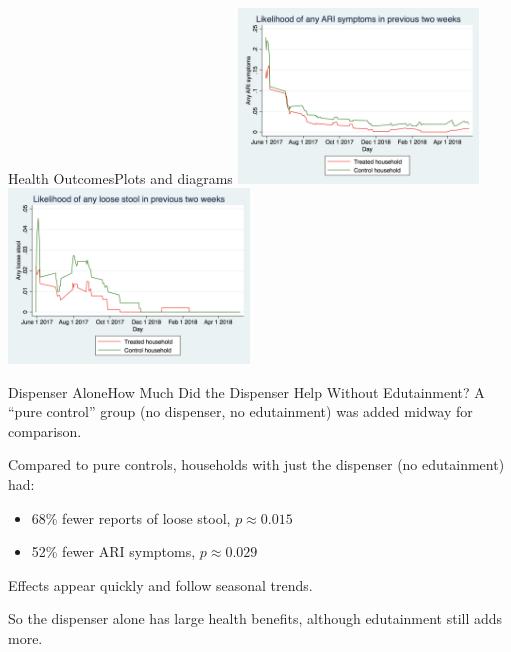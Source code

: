 \documentclass[aspectratio=169]{beamer}
\begin{document}
\begin{frame}{Health Outcomes}{Plots and diagrams}
	\includegraphics[width=0.48\textwidth]{img-004.png}
	\includegraphics[width=0.48\textwidth]{img-006.png}
\end{frame}

\begin{frame}{Dispenser Alone}{How Much Did the Dispenser Help Without Edutainment?}
	A “pure control” group (no dispenser, no edutainment) was added midway
	for comparison.

	Compared to pure controls, households with just the dispenser (no
	edutainment) had:
	\begin{itemize}
		\item 68\% fewer reports of loose stool, $p \approx 0.015$
		\item 52\% fewer ARI symptoms, $p \approx 0.029$
	\end{itemize}

	Effects appear quickly and follow seasonal trends.

	So the dispenser alone has large health benefits, although edutainment
	still adds more.
\end{frame}
\end{document}
